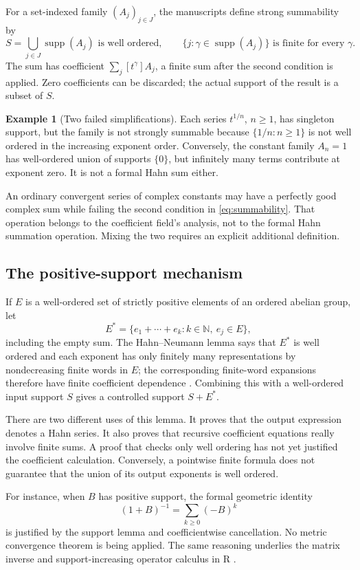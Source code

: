 \documentclass[11pt,letterpaper]{article}
\numberwithin{equation}{section}
\theoremstyle{definition}
\newtheorem{example}[theorem]{Example}
\theoremstyle{remark}
\newcommand{\N}{\mathbb N}
\newcommand{\supp}{\operatorname{supp}}
\begin{document}
For a set-indexed family $(A_j)_{j\in J}$, the manuscripts define strong summability by
\begin{equation}\label{eq:summability}
S=\bigcup_{j\in J}\supp(A_j)\text{ is well ordered},\qquad
\{j:\gamma\in\supp(A_j)\}\text{ is finite for every }\gamma.
\end{equation}
The sum has coefficient $\sum_j [t^\gamma]A_j$, a finite sum after the second condition is applied. Zero coefficients can be discarded; the actual support of the result is a subset of $S$.

\begin{example}[Two failed simplifications]
Each series $t^{1/n}$, $n\ge1$, has singleton support, but the family is not strongly summable because $\{1/n:n\ge1\}$ is not well ordered in the increasing exponent order. Conversely, the constant family $A_n=1$ has well-ordered union of supports $\{0\}$, but infinitely many terms contribute at exponent zero. It is not a formal Hahn sum either.
\end{example}
An ordinary convergent series of complex constants may have a perfectly good complex sum while failing the second condition in \eqref{eq:summability}. That operation belongs to the coefficient field's analysis, not to the formal Hahn summation operation. Mixing the two requires an explicit additional definition.

\subsection{The positive-support mechanism}
If $E$ is a well-ordered set of strictly positive elements of an ordered abelian group, let
\[
E^*=\{e_1+\cdots+e_k:k\in\N,\ e_j\in E\},
\]
including the empty sum. The Hahn--Neumann lemma says that $E^*$ is well ordered and each exponent has only finitely many representations by nondecreasing finite words in $E$; the corresponding finite-word expansions therefore have finite coefficient dependence \cite{Neumann}. Combining this with a well-ordered input support $S$ gives a controlled support $S+E^*$.

There are two different uses of this lemma. It proves that the output expression denotes a Hahn series. It also proves that recursive coefficient equations really involve finite sums. A proof that checks only well ordering has not yet justified the coefficient calculation. Conversely, a pointwise finite formula does not guarantee that the union of its output exponents is well ordered.

For instance, when $B$ has positive support, the formal geometric identity
\[
(1+B)^{-1}=\sum_{k\ge0}(-B)^k
\]
is justified by the support lemma and coefficientwise cancellation. No metric convergence theorem is being applied. The same reasoning underlies the matrix inverse and support-increasing operator calculus in R \cite{SourceR}.
\end{document}
